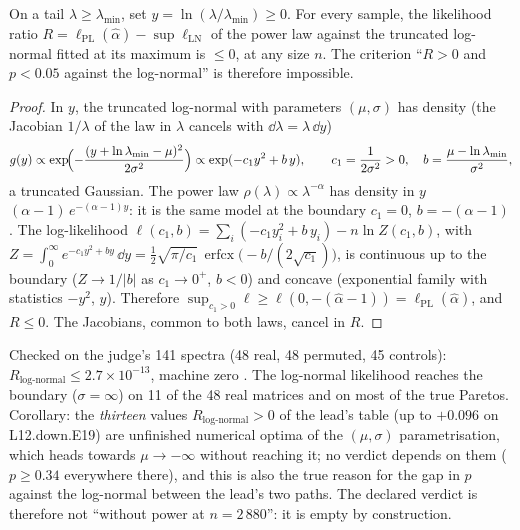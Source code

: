 \begin{theoreme}\label{t3spe:thm:bord}
On a tail $\lambda \ge \lambda_{\min}$, set $y = \ln(\lambda/\lambda_{\min}) \ge 0$. For every sample, the likelihood ratio $R = \ell_{\mathrm{PL}}(\hat\alpha) - \sup \ell_{\mathrm{LN}}$ of the power law against the truncated log-normal fitted at its maximum is $\le 0$, at any size $n$. The criterion ``$R > 0$ and $p < 0.05$ against the log-normal'' is therefore impossible.
\end{theoreme}
\begin{proof}
In $y$, the truncated log-normal with parameters $(\mu, \sigma)$ has density (the Jacobian $1/\lambda$ of the law in $\lambda$ cancels with $\dd\lambda = \lambda\,\dd y$)
\[
g(y) \propto \exp\!\Bigl(-\frac{(y + \ln\lambda_{\min} - \mu)^2}{2\sigma^2}\Bigr) \propto \exp(-c_1 y^2 + b\,y), \qquad c_1 = \frac{1}{2\sigma^2} > 0,\quad b = \frac{\mu - \ln\lambda_{\min}}{\sigma^2},
\]
a truncated Gaussian. The power law $\rho(\lambda) \propto \lambda^{-\alpha}$ has density in $y$ $(\alpha - 1)\,e^{-(\alpha - 1)y}$: it is the same model at the boundary $c_1 = 0$, $b = -(\alpha - 1)$. The log-likelihood $\ell(c_1, b) = \sum_i(-c_1 y_i^2 + b\,y_i) - n\ln Z(c_1, b)$, with $Z = \int_0^\infty e^{-c_1 y^2 + by}\,\dd y = \tfrac12\sqrt{\pi/c_1}\,\operatorname{erfcx}\bigl(-b/(2\sqrt{c_1})\bigr)$, is continuous up to the boundary ($Z \to 1/|b|$ as $c_1 \to 0^+$, $b < 0$) and concave (exponential family with statistics $-y^2$, $y$). Therefore $\sup_{c_1 > 0} \ell \ge \ell(0, -(\hat\alpha - 1)) = \ell_{\mathrm{PL}}(\hat\alpha)$, and $R \le 0$. The Jacobians, common to both laws, cancel in $R$.
\end{proof}

Checked on the judge's 141 spectra (48 real, 48 permuted, 45 controls): $R_{\text{log-normal}} \le 2.7 \times 10^{-13}$, machine zero \mes. The log-normal likelihood reaches the boundary ($\sigma = \infty$) on 11 of the 48 real matrices and on most of the true Paretos. Corollary: the \emph{thirteen} values $R_{\text{log-normal}} > 0$ of the lead's table (up to $+0.096$ on L12.down.E19) are unfinished numerical optima of the $(\mu, \sigma)$ parametrisation, which heads towards $\mu \to -\infty$ without reaching it; no verdict depends on them ($p \ge 0.34$ everywhere there), and this is also the true reason for the gap in $p$ against the log-normal between the lead's two paths. The declared verdict is therefore not ``without power at $n = 2\,880$'': it is empty by construction.

